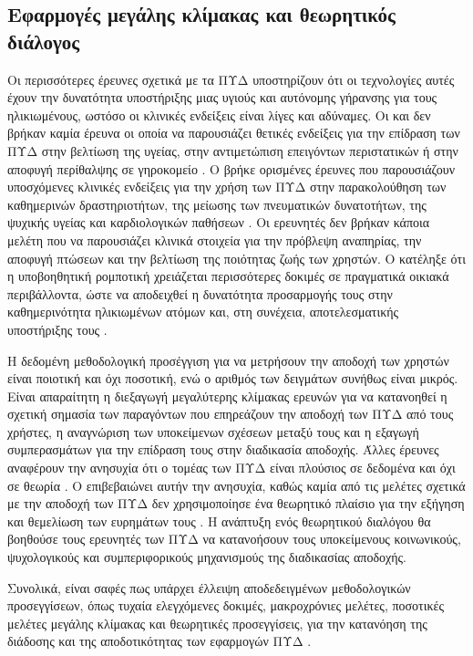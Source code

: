 \subsection{Εφαρμογές μεγάλης κλίμακας και θεωρητικός διάλογος}
Οι περισσότερες έρευνες σχετικά με τα ΠΥΔ υποστηρίζουν ότι οι τεχνολογίες αυτές έχουν την δυνατότητα υποστήριξης μιας υγιούς και αυτόνομης γήρανσης για τους ηλικιωμένους, ωστόσο οι κλινικές ενδείξεις είναι λίγες και αδύναμες.
Οι  και  δεν βρήκαν καμία έρευνα οι οποία να παρουσιάζει θετικές ενδείξεις για την επίδραση των ΠΥΔ στην βελτίωση της υγείας, στην αντιμετώπιση επειγόντων περιστατικών ή στην αποφυγή περίθαλψης σε γηροκομείο \cite{Demiris2008}.
Ο  βρήκε ορισμένες έρευνες που παρουσιάζουν υποσχόμενες κλινικές ενδείξεις για την χρήση των ΠΥΔ στην παρακολούθηση των καθημερινών δραστηριοτήτων, της μείωσης των πνευματικών δυνατοτήτων, της ψυχικής υγείας και καρδιολογικών παθήσεων \cite{Liu2016}.
Οι ερευνητές δεν βρήκαν κάποια μελέτη που να παρουσιάζει κλινικά στοιχεία για την πρόβλεψη αναπηρίας, την αποφυγή πτώσεων και την βελτίωση της ποιότητας ζωής των χρηστών.
Ο  κατέληξε ότι η υποβοηθητική ρομποτική χρειάζεται περισσότερες δοκιμές σε πραγματικά οικιακά περιβάλλοντα, ώστε να αποδειχθεί η δυνατότητα προσαρμογής τους στην καθημερινότητα ηλικιωμένων ατόμων και, στη συνέχεια, αποτελεσματικής υποστήριξης τους \cite{Robinson2014}.
\par
Η δεδομένη μεθοδολογική προσέγγιση για να μετρήσουν την αποδοχή των χρηστών είναι ποιοτική και όχι ποσοτική, ενώ ο αριθμός των δειγμάτων συνήθως είναι μικρός.
Είναι απαραίτητη η διεξαγωγή μεγαλύτερης κλίμακας ερευνών για να κατανοηθεί η σχετική σημασία των παραγόντων που επηρεάζουν την αποδοχή των ΠΥΔ από τους χρήστες, η αναγνώριση των υποκείμενων σχέσεων μεταξύ τους και η εξαγωγή συμπερασμάτων για την επίδραση τους στην διαδικασία αποδοχής.
Άλλες έρευνες αναφέρουν την ανησυχία ότι ο τομέας των ΠΥΔ είναι πλούσιος σε δεδομένα και όχι σε θεωρία \cite{Blackman2016}.
Ο  επιβεβαιώνει αυτήν την ανησυχία, καθώς καμία από τις μελέτες σχετικά με την αποδοχή των ΠΥΔ δεν χρησιμοποίησε ένα θεωρητικό πλαίσιο για την εξήγηση και θεμελίωση των ευρημάτων τους \cite{Liu2016}.
Η ανάπτυξη ενός θεωρητικού διαλόγου θα βοηθούσε τους ερευνητές των ΠΥΔ να κατανοήσουν τους υποκείμενους κοινωνικούς, ψυχολογικούς και συμπεριφορικούς μηχανισμούς της διαδικασίας αποδοχής.
\par
Συνολικά, είναι σαφές πως υπάρχει έλλειψη αποδεδειγμένων μεθοδολογικών προσεγγίσεων, όπως τυχαία ελεγχόμενες δοκιμές, μακροχρόνιες μελέτες, ποσοτικές μελέτες μεγάλης κλίμακας και θεωρητικές προσεγγίσεις, για την κατανόηση της διάδοσης και της αποδοτικότητας των εφαρμογών ΠΥΔ \cite{Martin2008}\cite{Morris2013}\cite{Peek2014}.